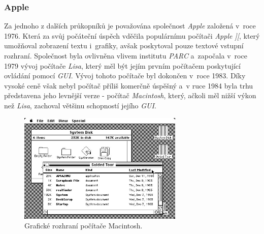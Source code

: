 \documentclass[11pt,twoside,a4paper]{book}
\begin{document}
\subsubsection{Apple}
Za jednoho z dalších průkopníků je považována společnost \textit{Apple} založená v~roce 1976. Která za svůj počáteční úspěch vděčila populárnímu počítači \textit{Apple ][}, který umožňoval zobrazení textu i~grafiky, avšak poskytoval pouze textové vstupní rozhraní. Společnost byla ovlivněna vlivem institutu \textit{PARC} a~započala v~roce 1979 vývoj počítače \textit{Lisa}, který měl být jejím prvním počítačem poskytující ovládání pomocí \textit{GUI}. Vývoj tohoto počítače byl dokončen v~roce 1983. Díky vysoké ceně však nebyl počítač příliš komerčně úspěšný a~v ruce 1984 byla trhu představena jeho levnější verze - počítač \textit{Macintosh}, který, ačkoli měl nižší výkon než \textit{Lisa}, zachoval většinu schopností jejího \textit{GUI}.
\begin{figure}[!ht]
\begin{center}
  \includegraphics[width=0.7\textwidth]{mac}
\caption{{\label{fig:macGUI}}Grafické rozhraní počítače Macintosh.\cite{bib:macImage}}
\end{center}
\end{figure}
\end{document}
